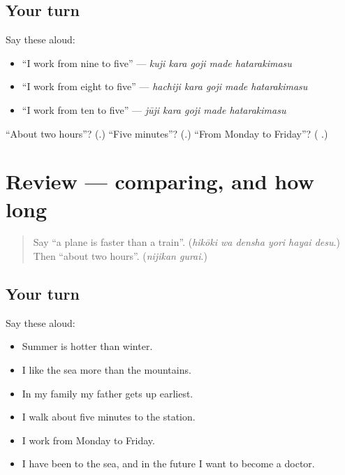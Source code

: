 \subsection*{Your turn}
Say these aloud:

\begin{itemize}
\raggedright
  \item \textquotedblleft{}I work from nine to five\textquotedblright{} — \emph{kuji kara goji made hatarakimasu}
  \item \textquotedblleft{}I work from eight to five\textquotedblright{} — \emph{hachiji kara goji made hatarakimasu}
  \item \textquotedblleft{}I work from ten to five\textquotedblright{} — \emph{jūji kara goji made hatarakimasu}
\end{itemize}

\begin{tcolorbox}[breakable,colback=teal!4,colframe=teal!35!black,title={Before you move on}]
\textquotedblleft{}About two hours\textquotedblright{}? (\textbf{}.) \textquotedblleft{}Five minutes\textquotedblright{}? (\textbf{}.) \textquotedblleft{}From Monday to Friday\textquotedblright{}? (\textbf{ }.)
\end{tcolorbox}
\section[(review)]{Review — comparing, and how long}

\label{lesson:JA-R259-comparing-and-how-long}



\begin{quote}
Say \textquotedblleft{}a plane is faster than a train\textquotedblright{}. (\emph{hikōki wa densha yori hayai desu}.) Then \textquotedblleft{}about two hours\textquotedblright{}. (\emph{nijikan gurai}.)
\end{quote}

\subsection*{Your turn}
Say these aloud:

\begin{itemize}
\raggedright
  \item Summer is hotter than winter.
  \item I like the sea more than the mountains.
  \item In my family my father gets up earliest.
  \item I walk about five minutes to the station.
  \item I work from Monday to Friday.
  \item I have been to the sea, and in the future I want to become a doctor.
\end{itemize}

